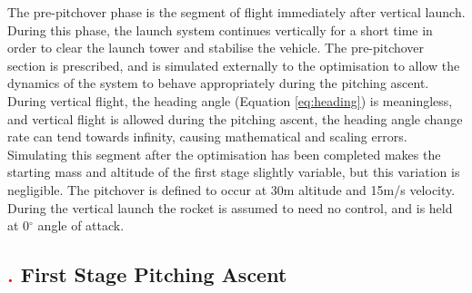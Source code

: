  The pre-pitchover phase is the segment of flight immediately after vertical launch. During this phase, the launch system continues vertically for a short time in order to clear the launch tower and stabilise the vehicle.        
The pre-pitchover section is prescribed, and is simulated externally to the optimisation to allow the dynamics of the system to behave appropriately during the pitching ascent. During vertical flight, the heading angle (Equation \ref{eq:heading}) is meaningless, and vertical flight is allowed during the pitching ascent, the heading angle change rate can tend towards infinity, causing mathematical and scaling errors. Simulating this segment after the optimisation has been completed makes the starting mass and altitude of the first stage slightly variable, but this variation is negligible. 
The pitchover is defined to occur at 30m altitude and 15m/s velocity.
During the vertical launch the rocket is assumed to need no control, and is held at 0$^\circ$ angle of attack. 

\subsection{\textcolor{red}{.} First Stage Pitching Ascent}

